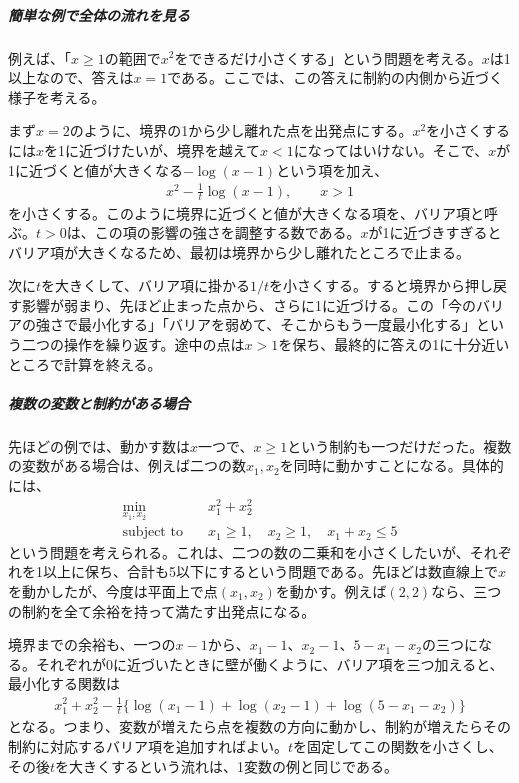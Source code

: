 \documentclass[a4j]{jarticle}
\begin{document}
\subparagraph{簡単な例で全体の流れを見る}
例えば、「$x\ge1$の範囲で$x^2$をできるだけ小さくする」という問題を考える。$x$は1以上なので、答えは$x=1$である。ここでは、この答えに制約の内側から近づく様子を考える。

まず$x=2$のように、境界の1から少し離れた点を出発点にする。$x^2$を小さくするには$x$を1に近づけたいが、境界を越えて$x<1$になってはいけない。そこで、$x$が1に近づくと値が大きくなる$-\log(x-1)$という項を加え、
\begin{align}
  x^2-\frac1t\log(x-1),\qquad x>1
  \label{eq:barrier-simple-example}
\end{align}
を小さくする。このように境界に近づくと値が大きくなる項を、バリア項と呼ぶ。$t>0$は、この項の影響の強さを調整する数である。$x$が1に近づきすぎるとバリア項が大きくなるため、最初は境界から少し離れたところで止まる。

次に$t$を大きくして、バリア項に掛かる$1/t$を小さくする。すると境界から押し戻す影響が弱まり、先ほど止まった点から、さらに1に近づける。この「今のバリアの強さで最小化する」「バリアを弱めて、そこからもう一度最小化する」という二つの操作を繰り返す。途中の点は$x>1$を保ち、最終的に答えの1に十分近いところで計算を終える。

\subparagraph{複数の変数と制約がある場合}

先ほどの例では、動かす数は$x$一つで、$x\ge1$という制約も一つだけだった。複数の変数がある場合は、例えば二つの数$x_1,x_2$を同時に動かすことになる。具体的には、
\begin{align}
  \min_{x_1,x_2}\quad &x_1^2+x_2^2\\
  \text{subject to}\quad &x_1\ge1,\quad x_2\ge1,\quad x_1+x_2\le5
  \label{eq:barrier-two-variables}
\end{align}
という問題を考えられる。これは、二つの数の二乗和を小さくしたいが、それぞれを1以上に保ち、合計も5以下にするという問題である。先ほどは数直線上で$x$を動かしたが、今度は平面上で点$(x_1,x_2)$を動かす。例えば$(2,2)$なら、三つの制約を全て余裕を持って満たす出発点になる。

境界までの余裕も、一つの$x-1$から、$x_1-1$、$x_2-1$、$5-x_1-x_2$の三つになる。それぞれが0に近づいたときに壁が働くように、バリア項を三つ加えると、最小化する関数は
\begin{align}
  x_1^2+x_2^2-\frac1t\bigl\{
  \log(x_1-1)+\log(x_2-1)+\log(5-x_1-x_2)\bigr\}
  \label{eq:barrier-two-variables-objective}
\end{align}
となる。つまり、変数が増えたら点を複数の方向に動かし、制約が増えたらその制約に対応するバリア項を追加すればよい。$t$を固定してこの関数を小さくし、その後$t$を大きくするという流れは、1変数の例と同じである。
\end{document}

